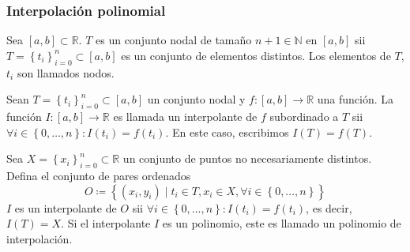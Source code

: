 \begin{frame}
	\frametitle{Interpolación polinomial}

	\begin{definition}
		Sea
		\begin{math}
			\left[a,b\right]\subset
			\mathbb{R}
		\end{math}.
		$T$ es un \alert{conjunto nodal} de tamaño
		$n+1\in\mathbb{N}$ en $\left[a,b\right]$ sii
		\begin{math}
			T=
			{
			\left\{
			t_{i}
			\right\}
			}^{n}_{i=0}\subset
			\left[a,b\right]
		\end{math}
		es un conjunto de elementos distintos.
		Los elementos de $T$, $t_{i}$ son llamados \alert{nodos}.
	\end{definition}

	\begin{definition}
		Sean
		\begin{math}
			T=
			{
			\left\{
			t_{i}
			\right\}
			}^{n}_{i=0}\subset
			\left[a,b\right]
		\end{math}
		un conjunto nodal y
		\begin{math}
			f\colon
			\left[a,b\right]\to
			\mathbb{R}
		\end{math}
		una función.
		La función $I\colon\left[a,b\right]\to\mathbb{R}$ es llamada un
		\alert{interpolante de} $f$ subordinado a $T$ sii
		\begin{math}
			\forall i\in\left\{0,\dotsc,n\right\}:
			I\left(t_{i}\right)=f\left(t_{i}\right)
		\end{math}.
		En este caso, escribimos
		\begin{math}
			I\left(T\right)=
			f\left(T\right)
		\end{math}.
	\end{definition}

	\begin{definition}
		Sea
		\begin{math}
			X=
			{
			\left\{
			x_{i}
			\right\}
			}^{n}_{i=0}\subset
			\mathbb{R}
		\end{math}
		un conjunto de puntos no necesariamente distintos.
		Defina el conjunto de pares ordenados
		\begin{equation*}
			O\coloneqq
			\left\{
			\left(x_{i},y_{i}\right)\mid
			t_{i}\in T,
			x_{i}\in X,
			\forall i\in\left\{0,\dotsc,n\right\}
			\right\}
		\end{equation*}
		$I$ es un interpolante de $O$ sii
		\begin{math}
			\forall i\in\left\{0,\dotsc,n\right\}:
			I\left(t_{i}\right)=
			f\left(t_{i}\right)
		\end{math},
		es decir, $I\left(T\right)=X$.
		Si el interpolante $I$ es un polinomio, este es llamado un
		\alert{polinomio de interpolación}.
	\end{definition}


\end{frame}
